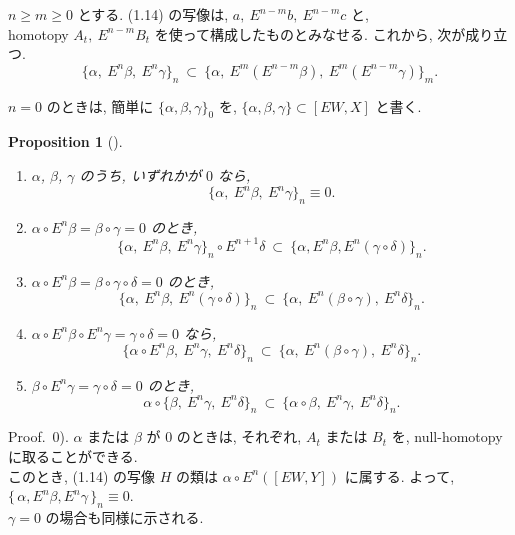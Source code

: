 \documentclass[12pt, leqno]{ltjsarticle}
\newcommand{\Ex}{E}        %
\newcommand{\todai}[2][]{\{\,#2\,\}_{#1}}      %
\numberwithin{equation}{section}
\theoremstyle{plain}
\newtheorem{proposition}[theorem]{Proposition}
\theoremstyle{definition}
\theoremstyle{remark}
\begin{document}
\(n\ge m\ge 0\) とする.
(1.14) の写像は,
\(a,\ E^{n-m}b,\ E^{n-m}c\) と, \\
homotopy \(A_t,\ E^{n-m}B_t\)
を使って構成したものとみなせる.
これから, 次が成り立つ.
\begin{equation}\label{eq:split-m}
\{\alpha,\ \Ex^n\beta,\ \Ex^n\gamma\}_n
\ \subset\
\bigl\{\alpha,\ \Ex^{m}(E^{n-m}\beta),\ E^{m}(E^{n-m}\gamma)\bigr\}_m .
\end{equation}

$n=0$ のときは, 
簡単に $\{\alpha,\beta,\gamma\}_0$ を,
$\{\alpha,\beta,\gamma\} \subset[\Ex W, X]$ と書く. 

\begin{proposition}[]\label{prop:1-2}
\leavevmode
\begin{enumerate}
\item[$0).$] $\alpha$, $\beta$, $\gamma$ のうち, いずれかが $0$ なら,
\[
\{\alpha,\ \Ex^n\beta,\ \Ex^n\gamma\}_n\equiv0.
\]
\item[$i).$] $\alpha\circ \Ex^n\beta=\beta\circ\gamma=0$ のとき,
\[
\{\alpha,\ \Ex^n\beta,\ \Ex^n\gamma\}_n\circ\Ex^{n+1}\delta\ \subset\ \{\alpha,\Ex^n \beta, \Ex^n(\gamma\circ\delta)\}_n.
\]
\item[$ii).$] $\alpha\circ \Ex^n\beta=\beta\circ\gamma\circ\delta=0$ のとき,
\[
\{\alpha,\ \Ex^n\beta,\ \Ex^n(\gamma\circ\delta)\}_n\ \subset\ \{\alpha,\ \Ex^n(\beta\circ\gamma),\ \Ex^n\delta\}_n .
\]
\item[$iii).$] $\alpha\circ\Ex^n\beta\circ\Ex^n\gamma=\gamma\circ\delta=0$ なら,
\[
\{\alpha\circ\Ex^n\beta,\ \Ex^n\gamma,\ \Ex^n\delta\}_n\ \subset\ \{\alpha,\ \Ex^n(\beta\circ\gamma),\ \Ex^n\delta\}_n .
\]
\item[$iv).$] $\beta\circ\Ex^n\gamma=\gamma\circ\delta=0$ のとき,
\[
\alpha\circ\{\beta,\ \Ex^n\gamma,\ \Ex^n\delta\}_n\ \subset\ \{\alpha\circ\beta,\ \Ex^n\gamma,\ \Ex^n\delta\}_n .
\]
\end{enumerate}
\end{proposition}

Proof.\ 
0). $\alpha$ または $\beta$ が $0$ のときは, 
それぞれ, $A_t$ または $B_t$ を,
null-homotopy に取ることができる. \\
このとき, (1.14) の写像 \(H\) の類は 
\(\alpha\circ E^n([EW,Y])\) に属する.
よって, \(\todai[n]{\alpha, E^n\beta, E^n\gamma}\equiv0\).\\
\(\gamma=0\) の場合も同様に示される.
\end{document}

